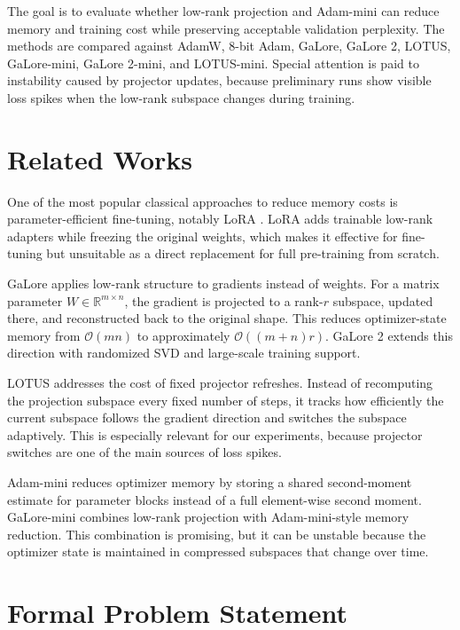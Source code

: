 \documentclass[conference]{IEEEtran}
\begin{document}
The goal is to evaluate whether low-rank projection and Adam-mini can reduce memory and training cost while preserving acceptable validation perplexity. The methods are compared against AdamW, 8-bit Adam, GaLore, GaLore 2, LOTUS, GaLore-mini, GaLore 2-mini, and LOTUS-mini. Special attention is paid to instability caused by projector updates, because preliminary runs show visible loss spikes when the low-rank subspace changes during training.

\section{Related Works}

One of the most popular classical approaches to reduce memory costs is parameter-efficient fine-tuning, notably LoRA \cite{hu2022lora}. LoRA adds trainable low-rank adapters while freezing the original weights, which makes it effective for fine-tuning but unsuitable as a direct replacement for full pre-training from scratch.

GaLore \cite{Galore} applies low-rank structure to gradients instead of weights. For a matrix parameter $W \in \mathbb{R}^{m \times n}$, the gradient is projected to a rank-$r$ subspace, updated there, and reconstructed back to the original shape. This reduces optimizer-state memory from $\mathcal{O}(mn)$ to approximately $\mathcal{O}((m+n)r)$. GaLore 2 \cite{su2025galore2largescalellm} extends this direction with randomized SVD and large-scale training support.

LOTUS \cite{miao2026lotusefficientllmtraining} addresses the cost of fixed projector refreshes. Instead of recomputing the projection subspace every fixed number of steps, it tracks how efficiently the current subspace follows the gradient direction and switches the subspace adaptively. This is especially relevant for our experiments, because projector switches are one of the main sources of loss spikes.

Adam-mini \cite{zhang2025adamminiusefewerlearning} reduces optimizer memory by storing a shared second-moment estimate for parameter blocks instead of a full element-wise second moment. GaLore-mini \cite{huang2024galoremini} combines low-rank projection with Adam-mini-style memory reduction. This combination is promising, but it can be unstable because the optimizer state is maintained in compressed subspaces that change over time.

\section{Formal Problem Statement}
\end{document}
